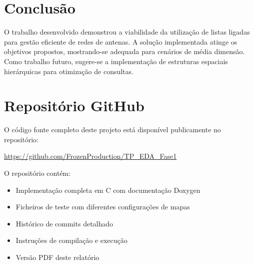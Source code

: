 \documentclass[a4paper,12pt]{report}
\begin{document}
\chapter{Conclusão}
O trabalho desenvolvido demonstrou a viabilidade da utilização de listas ligadas para gestão eficiente de redes de antenas. A solução implementada atinge os objetivos propostos, mostrando-se adequada para cenários de média dimensão. Como trabalho futuro, sugere-se a implementação de estruturas espaciais hierárquicas para otimização de consultas.

\chapter*{Repositório GitHub}
\label{chap:github}

O código fonte completo deste projeto está disponível publicamente no repositório:

\begin{center}
\url{https://github.com/FrozenProduction/TP_EDA_Fase1}
\end{center}

O repositório contém:
\begin{itemize}
\item Implementação completa em C com documentação Doxygen
\item Ficheiros de teste com diferentes configurações de mapas
\item Histórico de commits detalhado
\item Instruções de compilação e execução
\item Versão PDF deste relatório
\end{itemize}
\end{document}
